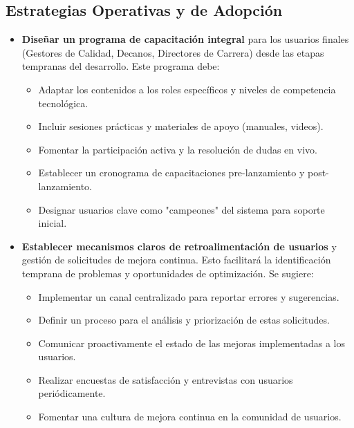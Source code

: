 \subsection{Estrategias Operativas y de Adopción}
\begin{itemize}
    \item \textbf{Diseñar un programa de capacitación integral} para los usuarios
        finales (Gestores de Calidad, Decanos, Directores de Carrera) desde las etapas
        tempranas del desarrollo. Este programa debe:
        \begin{itemize}
            \item Adaptar los contenidos a los roles específicos y niveles de competencia tecnológica.
            \item Incluir sesiones prácticas y materiales de apoyo (manuales, videos).
            \item Fomentar la participación activa y la resolución de dudas en vivo.
            \item Establecer un cronograma de capacitaciones pre-lanzamiento y post-lanzamiento.
            \item Designar usuarios clave como "campeones" del sistema para soporte inicial.
        \end{itemize}

    \item \textbf{Establecer mecanismos claros de retroalimentación de usuarios}
        y gestión de solicitudes de mejora continua. Esto facilitará la identificación
        temprana de problemas y oportunidades de optimización. Se sugiere:
        \begin{itemize}
            \item Implementar un canal centralizado para reportar errores y sugerencias.
            \item Definir un proceso para el análisis y priorización de estas solicitudes.
            \item Comunicar proactivamente el estado de las mejoras implementadas a los usuarios.
            \item Realizar encuestas de satisfacción y entrevistas con usuarios periódicamente.
            \item Fomentar una cultura de mejora continua en la comunidad de usuarios.
        \end{itemize}


\end{itemize}
